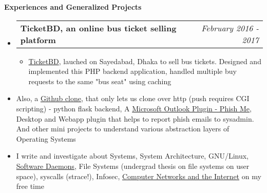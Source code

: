 \documentclass[legalpaper,10pt]{article}
\makeatletter
\newcommand{\resheading}[1]{{\large \colorbox{mygrey}{\begin{minipage}{\textwidth}{\textbf{#1 \vphantom{p\^{E}}}}\end{minipage}}}}
\newcommand{\ressubheading}[4]{
	\begin{tabular*}{7.1in}{l@{\extracolsep{\fill}}r}
		\textbf{#1} & \textit{#4} \\
	\end{tabular*}\vspace{-6pt}}
\makeatother
\begin{document}
	\vspace{0.20in}
	
	\resheading{Experiences and Generalized Projects}
	\begin{itemize}
	
		\item \ressubheading{TicketBD, an online bus ticket selling platform}{}{}{February 2016 - 2017}
		\begin{itemize} 
			\item \href{https://www.facebook.com/ticketbd.online}{TicketBD}, lauched on Sayedabad, Dhaka to sell bus tickets. Designed and implemented this PHP backend application, handled multiple buy requests to the same "bus seat" using caching
		\end{itemize}

	    \vspace{0.03in}

		\item Also, a \href{https://ovebepari.github.io/linux\%7Csystems/i-made-my-own-github-not-really/}{Github clone}, that only lets us clone over http (push requires CGI scripting) - python flask backend, A \href{https://github.com/ovebepari/PhishMe}{Microsoft Outlook Plugin - Phish Me}, Desktop and Webapp plugin that helps to report phish emails to sysadmin. And other mini projects to understand various abstraction layers of Operating Systems
		
		\vspace{0.03in}

		\item I write and investigate about Systems, System Architecture, GNU/Linux, \href{https://ovebepari.github.io/linux\%7Csystems/docker-socket-tale/}{Software Daemons}, File Systems (undergrad thesis on file systems on user space), syscalls (strace!), Infosec, \href{https://ovebepari.github.io/Computer-Networking-Series/}{Computer Networks and the Internet} on my free time
	\end{itemize}

	\vspace{0.20in}
	
\end{document}
